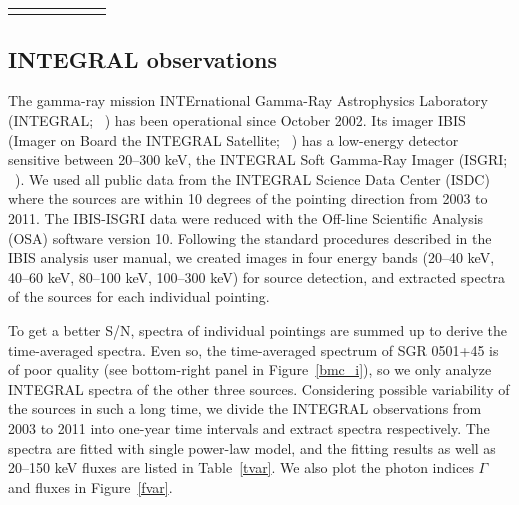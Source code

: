 \documentclass[]{raa}
\begin{document}
\begin{table}
\begin{tabular}{ccccccc}
  \noalign{\smallskip}\hline
\end{tabular}
\ec

\end{table}


\subsection{INTEGRAL observations}

The gamma-ray mission INTErnational Gamma-Ray Astrophysics Laboratory (INTEGRAL; ~\citealt{INTEGRAL}) has been operational since October 2002.
%
Its imager IBIS (Imager on Board the INTEGRAL Satellite; ~\citealt{IBIS}) has a low-energy detector sensitive between 20--300 keV, the INTEGRAL Soft Gamma-Ray Imager (ISGRI; ~\citealt{ISGRI}).
%
We used all public data from the INTEGRAL Science Data Center (ISDC) where the sources are within 10 degrees of the pointing direction from 2003 to 2011. 
%
The IBIS-ISGRI data were reduced with the Off-line Scientific Analysis (OSA) software version 10.
%
Following the standard procedures described in the IBIS analysis user manual, we created images in four energy bands (20--40 keV, 40--60 keV, 80--100 keV, 100--300 keV) for source detection, and extracted spectra of the sources for each individual pointing.
%
%

To get a better S/N, spectra of individual pointings are summed up to derive the time-averaged spectra.
%
Even so, the time-averaged spectrum of SGR 0501+45 is of poor quality (see bottom-right panel in Figure~\ref{bmc_i}), so we only analyze INTEGRAL spectra of the other three sources.
Considering possible variability of the sources in such a long time, we divide the INTEGRAL observations from 2003 to 2011 into one-year time intervals and extract spectra respectively. 
%
The spectra are fitted with single power-law model, and the fitting results as well as 20--150 keV fluxes are listed in Table~\ref{tvar}.
%
We also plot the photon indices $\Gamma$ and fluxes in Figure~\ref{fvar}.
\end{document}
